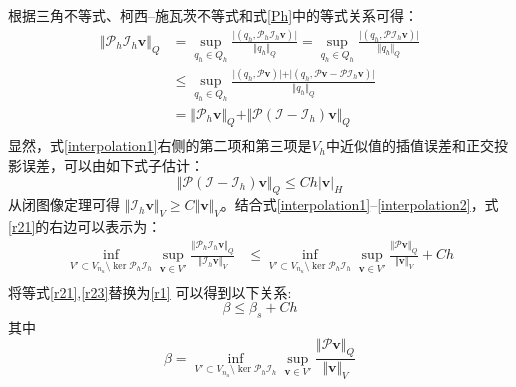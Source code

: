根据三角不等式、柯西--施瓦茨不等式和式\eqref{Ph}中的等式关系可得：
\begin{equation}\label{interpolation1}
    \begin{split}
        \Vert \mathcal P_h \mathcal I_h \boldsymbol v \Vert_Q &= 
        \sup_{q_h \in Q_h} \frac{\vert (q_h, \mathcal P_h \mathcal I_h \boldsymbol v) \vert}{\Vert q_h \Vert_Q}
        =\sup_{q_h \in Q_h} \frac{\vert (q_h, \mathcal P \mathcal I_h \boldsymbol v) \vert}{\Vert q_h \Vert_Q} \\
        &\le \sup_{q_h \in Q_h} \frac{\vert (q_h, \mathcal P \boldsymbol v)\vert + \vert (q_h, \mathcal P \boldsymbol v - \mathcal P \mathcal I_h \boldsymbol v) \vert}{\Vert q_h \Vert_Q} \\
        &= \Vert \mathcal P_h \boldsymbol v \Vert_Q
        + \Vert \mathcal P(\mathcal I - \mathcal I_h) \boldsymbol v \Vert_Q \\
    \end{split}
\end{equation}
显然，式\eqref{interpolation1}右侧的第二项和第三项是$V_h$中近似值的插值误差和正交投影误差，可以由如下式子估计\cite{yosida1995}：
\begin{equation}\label{interpolation2}
        \Vert \mathcal P(\mathcal I - \mathcal I_h) \boldsymbol v \Vert_Q \le Ch \vert \boldsymbol v \vert_{H} 
\end{equation}
从闭图像定理\cite{quarteroni1994}可得 $\Vert \mathcal I_h \boldsymbol v\Vert_V \ge C\Vert \boldsymbol v \Vert_V$。结合式\eqref{interpolation1}--\eqref{interpolation2}，式\eqref{r21}的右边可以表示为：
\begin{equation}\label{r23}
    \begin{split}
        \inf_{V'\subset V_{n_u}\setminus \ker \mathcal P_h \mathcal I_h} \sup_{\boldsymbol v \in V'} \frac{\Vert \mathcal P_h\mathcal I_h\boldsymbol v\Vert_Q}{\Vert \mathcal I_h \boldsymbol v\Vert_V} 
        &\le \inf_{V'\subset V_{n_u}\setminus \ker \mathcal P_h \mathcal I_h} \sup_{\boldsymbol v \in V'} \frac{\Vert \mathcal P \boldsymbol v\Vert_Q}{\Vert \boldsymbol v\Vert_V} + Ch \\
    \end{split}
\end{equation}
将等式\eqref{r21},\eqref{r23}替换为\eqref{r1} 可以得到以下关系:
\begin{equation}\label{r3}
    \beta \le \beta_s + Ch
\end{equation}
其中
\begin{equation}
    \beta = \inf_{V'\subset V_{n_u}\setminus\ker \mathcal P_h \mathcal I_h}\sup_{\boldsymbol v \in V'}\frac{\Vert \mathcal P \boldsymbol v\Vert_Q}{\Vert  \boldsymbol v\Vert_V} 
\end{equation}


